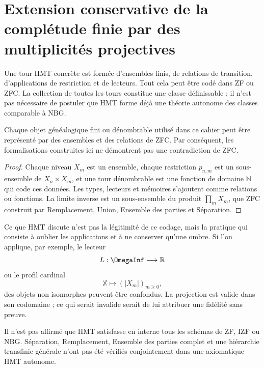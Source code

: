 \label{chap:p3-83-45-completitud_finita}

\section{Extension conservative de la complétude finie par des multiplicités projectives}

Une tour HMT concrète est formée d'ensembles finis, de relations de
transition, d'applications de restriction et de lecteurs. Tout cela peut
être codé dans ZF ou ZFC. La collection de toutes les tours constitue une
classe définissable ; il n'est pas nécessaire de postuler que HMT forme déjà une théorie
autonome des classes comparable à NBG.

\begin{proposition}
Chaque objet généalogique fini ou dénombrable utilisé dans ce cahier peut
être représenté par des ensembles et des relations de ZFC. Par conséquent, les
formalisations construites ici ne démontrent pas une contradiction de ZFC.
\end{proposition}

\begin{proof}
Chaque niveau \(X_m\) est un ensemble, chaque restriction \(p_{n,m}\) est un
sous-ensemble de \(X_n\times X_m\), et une tour dénombrable est une fonction de
domaine \(\mathbb N\) qui code ces données. Les types, lecteurs et mémoires
s'ajoutent comme relations ou fonctions. La limite inverse est un sous-ensemble
du produit \(\prod_mX_m\), que ZFC construit par Remplacement, Union,
Ensemble des parties et Séparation.
\end{proof}

Ce que HMT discute n'est pas la légitimité de ce codage, mais la pratique
qui consiste à oublier les applications et à ne conserver qu'une ombre. Si l'on applique, par exemple,
le lecteur
\[
  L:\OmegaInf\longrightarrow\mathbb R
\]
ou le profil cardinal
\[
  \mathbb X\longmapsto(|X_m|)_{m\ge0},
\]
des objets non isomorphes peuvent être confondus. La projection est valide dans son
codomaine ; ce qui serait invalide serait de lui attribuer une fidélité sans preuve.

\begin{remark}
Il n'est pas affirmé que HMT satisfasse en interne tous les schémas de ZF, IZF ou
NBG. Séparation, Remplacement, Ensemble des parties complet et une hiérarchie transfinie générale
n'ont pas été vérifiés conjointement dans une axiomatique HMT autonome.
\end{remark}

